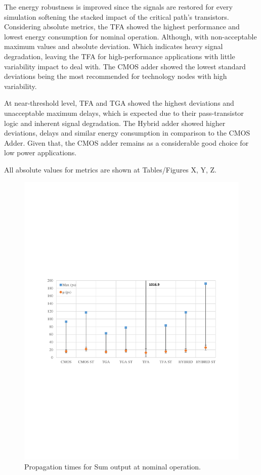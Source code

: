 \documentclass[ecp,tc, english]{iiufrgs}
\begin{document}
The energy robustness is improved since the signals are restored for every simulation softening the stacked impact of the critical path’s transistors. Considering absolute metrics, the TFA showed the highest performance and lowest energy consumption for nominal operation. Although, with non-acceptable maximum values and absolute deviation. Which indicates heavy signal degradation, leaving the TFA for high-performance applications with little variability impact to deal with. The CMOS adder showed the lowest standard deviations being the most recommended for technology nodes with high variability. 

At near-threshold level, TFA and TGA showed the highest deviations and unacceptable maximum delays, which is expected due to their pass-transistor logic and inherent signal degradation. The Hybrid adder showed higher deviations, delays and similar energy consumption in comparison to the CMOS Adder. Given that, the CMOS adder remains as a considerable good choice for low power applications.

All absolute values for metrics are shown at Tables/Figures X, Y, Z.

\begin{figure}[H]
\centering
\includegraphics[width=\textwidth, trim={0 9.5cm 0 9cm},clip]{delaysNominalSum.pdf}
\caption{Propagation times for Sum output at nominal operation.}
\label{fig:Fig43}
\end{figure}
\end{document}
